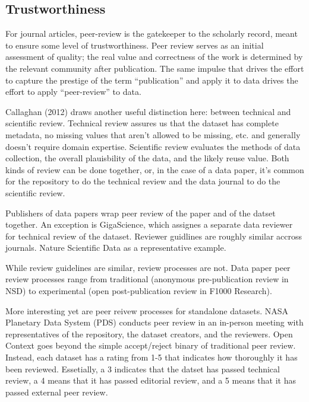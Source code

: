 \documentclass{article}
\begin{document}
\subsection{Trustworthiness}\label{trustworthiness}

For journal articles, peer-review is the gatekeeper to the scholarly record, meant to ensure some level of trustworthiness.
Peer review serves as an initial assessment of quality; the real value and correctness of the work is determined by the relevant community after publication. The same impulse that drives the effort to capture the prestige of the term ``publication'' and apply it to data drives the effort to apply ``peer-review'' to data.

Callaghan (2012)\cite{sarah_callaghan_making_2012} draws another useful distinction here: between technical and scientific review.
Technical review assures us that the dataset has complete metadata, no missing values that aren't allowed to be missing, etc. and generally doesn't require domain expertise.
Scientific review evaluates the methods of data collection, the overall plauisbility of the data, and the likely reuse value.
Both kinds of review can be done together, or, in the case of a data paper, it's common for the repository to do the technical review and the data journal to do the scientific review.

Publishers of data papers wrap peer review of the paper and of the datset together.
An exception is GigaScience, which assignes a separate data reviewer for technical review of the dataset.
Reviewer guidlines are roughly similar accross journals. Nature Scientific Data as a representative example.

While review guidelines are similar, review processes are not.
Data paper peer review processes range from traditional (anonymous pre-publication review in NSD) to experimental (open post-publication review in F1000 Research).

More interesting yet are peer reivew processes for standalone datasets.
NASA Planetary Data System (PDS) conducts peer review in an in-person meeting with representatives of the repository, the dataset creators, and the reviewers.
Open Context goes beyond the simple accept/reject binary of traditional peer review.
Instead, each dataset has a rating from 1-5 that indicates how thoroughly it has been reviewed. Essetially, a 3 indicates that the datset has passed technical review, a 4 means that it has passed editorial review, and a 5 means that it has passed external peer review.
\end{document}
